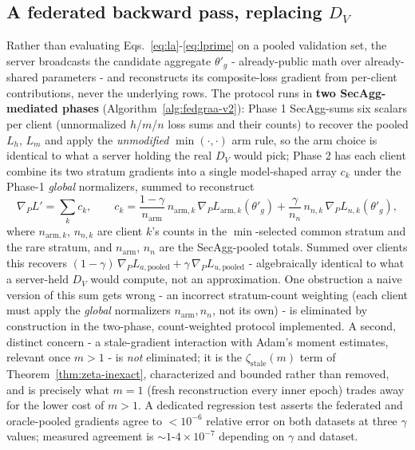 \documentclass[11pt,a4paper]{report}
\newcommand{\Lprime}{L'}
\begin{document}
\subsection{A federated backward pass, replacing \texorpdfstring{$D_V$}{DV}}
Rather than evaluating Eqs.~\eqref{eq:la}-\eqref{eq:lprime} on a pooled
validation set, the server broadcasts the candidate aggregate $\theta'_g$ -
already-public math over already-shared parameters - and reconstructs its
composite-loss gradient from per-client contributions, never the underlying
rows. The protocol runs in \textbf{two SecAgg-mediated phases}
(Algorithm~\ref{alg:fedgraa-v2}): Phase 1 SecAgg-sums six scalars per client
(unnormalized $h$/$m$/$n$ loss sums and their counts) to recover the pooled
$L_h$, $L_m$ and apply the \emph{unmodified} $\min(\cdot,\cdot)$ arm rule, so
the arm choice is identical to what a server holding the real $D_V$ would
pick; Phase 2 has each client combine its two stratum gradients into a single
model-shaped array $c_k$ under the Phase-1 \emph{global} normalizers, summed
to reconstruct
\begin{equation}
\nabla_P\Lprime = \sum_k c_k,\qquad
c_k = \frac{1-\gamma}{n_{\mathrm{arm}}}\,n_{\mathrm{arm},k}\,\nabla_P L_{\mathrm{arm},k}(\theta'_g)
    + \frac{\gamma}{n_n}\,n_{n,k}\,\nabla_P L_{n,k}(\theta'_g),
\label{eq:federated-grad}
\end{equation}
where $n_{\mathrm{arm},k}$, $n_{n,k}$ are client $k$'s counts in the
$\min$-selected common stratum and the rare stratum, and $n_{\mathrm{arm}}$,
$n_n$ are the SecAgg-pooled totals. Summed over clients this recovers
$(1-\gamma)\,\nabla_P L_{a,\mathrm{pooled}}+\gamma\,\nabla_P L_{u,\mathrm{pooled}}$ -
algebraically identical to what a server-held $D_V$ would compute, not an
approximation. One obstruction a naive version of this sum gets wrong
- an incorrect stratum-count weighting (each client must apply the
\emph{global} normalizers $n_{\mathrm{arm}},n_n$, not its own) - is
eliminated by construction in the two-phase, count-weighted protocol
implemented. A second, distinct concern - a stale-gradient interaction with
Adam's moment estimates, relevant once $m>1$ - is \emph{not} eliminated; it
is the $\zeta_{\mathrm{stale}}(m)$ term of Theorem~\ref{thm:zeta-inexact},
characterized and bounded rather than removed, and is precisely what $m=1$
(fresh reconstruction every inner epoch) trades away for the lower cost of
$m>1$. A dedicated regression test asserts the federated and
oracle-pooled gradients agree to $<10^{-6}$ relative error on both datasets
at three $\gamma$ values; measured agreement is $\sim1$-$4\times10^{-7}$
depending on $\gamma$ and dataset.
\end{document}
